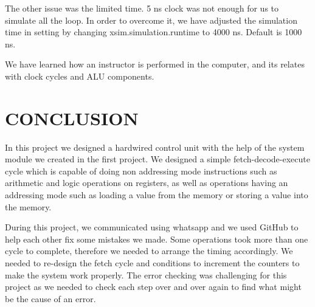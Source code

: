 \documentclass[pdftex,12pt,a4paper]{article}
\begin{document}
    The other issue was the limited time. 5 ns clock was not enough for us to simulate all the loop. In order to
overcome it, we have adjusted the simulation time in setting by changing xsim.simulation.runtime to 4000 ns. Default is
1000 ns.

    We have learned how an instructor is performed in the computer, and its relates with clock cycles and ALU components.



\section{CONCLUSION}
In this project we designed a hardwired control unit with the help of the system module we created in the
first project. We designed a simple fetch-decode-execute cycle which is capable of doing non addressing
mode instructions such as arithmetic and logic operations on registers, as well as operations having an
addressing mode such as loading a value from the memory or storing a value into the memory.

During this project, we communicated using whatsapp and we used GitHub to help each other fix some 
mistakes we made. Some operations took more than one cycle to complete, therefore we needed to arrange 
the timing accordingly. We needed to re-design the fetch cycle and conditions to increment the counters 
to make the system work properly. The error checking was challenging for this project as we needed to 
check each step over and over again to find what might be the cause of an error. 
\end{document}

